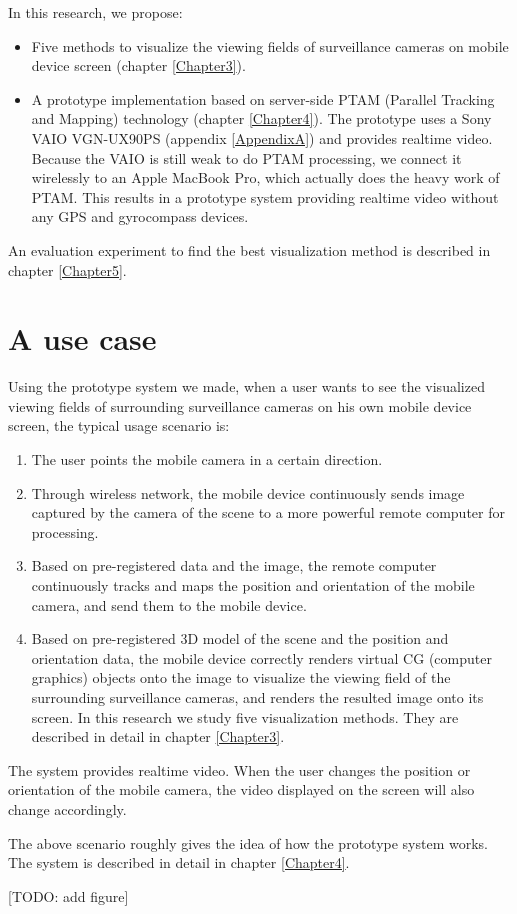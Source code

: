 In this research, we propose:
\begin{itemize}
	\item Five methods to visualize the viewing fields of surveillance cameras on mobile device screen (chapter \ref{Chapter3}).
	\item A prototype implementation based on server-side PTAM (Parallel Tracking and Mapping) \citep{Reference12} technology (chapter \ref{Chapter4}). The prototype uses a Sony VAIO VGN-UX90PS (appendix \ref{AppendixA}) and provides realtime video. Because the VAIO is still weak to do PTAM processing, we connect it wirelessly to an Apple MacBook Pro, which actually does the heavy work of PTAM. This results in a prototype system providing realtime video without any GPS and gyrocompass devices.
\end{itemize}

An evaluation experiment to find the best visualization method is described in chapter \ref{Chapter5}.

\section{A use case}

Using the prototype system we made, when a user wants to see the visualized viewing fields of surrounding surveillance cameras on his own mobile device screen, the typical usage scenario is:

\begin{enumerate}
	\item The user points the mobile camera in a certain direction.
	\item Through wireless network, the mobile device continuously sends image captured by the camera of the scene to a more powerful remote computer for processing.
	\item Based on pre-registered data and the image, the remote computer continuously tracks and maps the position and orientation of the mobile camera, and send them to the mobile device.
	\item Based on pre-registered 3D model of the scene and the position and orientation data, the mobile device correctly renders virtual CG (computer graphics) objects onto the image to visualize the viewing field of the surrounding surveillance cameras, and renders the resulted image onto its screen. In this research we study five visualization methods. They are described in detail in chapter \ref{Chapter3}.
\end{enumerate}

The system provides realtime video. When the user changes the position or orientation of the mobile camera, the video displayed on the screen will also change accordingly.

The above scenario roughly gives the idea of how the prototype system works. The system is described in detail in chapter \ref{Chapter4}.

[TODO: add figure]

